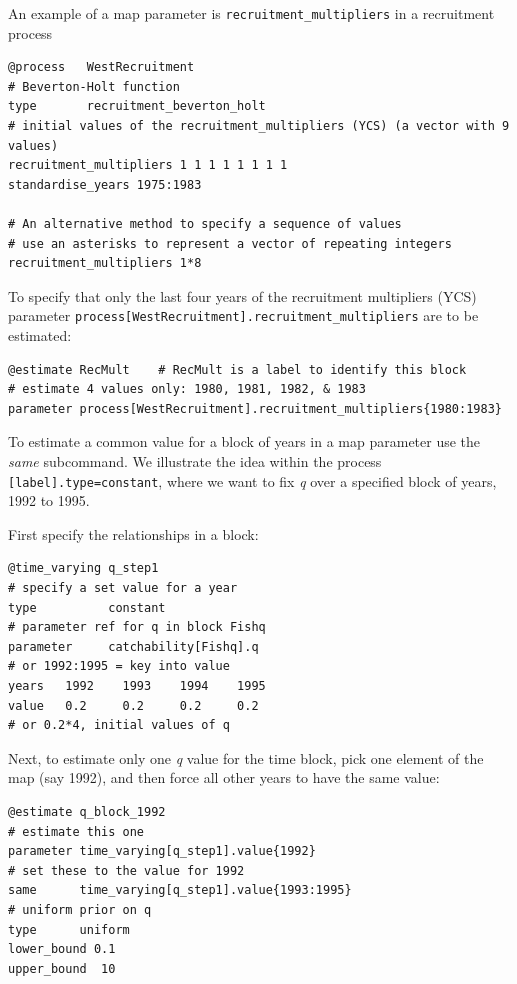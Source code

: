 An example of a map parameter is \texttt{recruitment\_multipliers} in a recruitment process

{\small{\begin{verbatim}
@process   WestRecruitment
# Beverton-Holt function
type       recruitment_beverton_holt
# initial values of the recruitment_multipliers (YCS) (a vector with 9 values)
recruitment_multipliers 1 1 1 1 1 1 1 1
standardise_years 1975:1983

# An alternative method to specify a sequence of values
# use an asterisks to represent a vector of repeating integers
recruitment_multipliers 1*8
\end{verbatim}}}

To specify that only the last four years of the recruitment multipliers (YCS) parameter \texttt{process[WestRecruitment].recruitment\_multipliers} are to be estimated:

{\small{\begin{verbatim}
@estimate RecMult    # RecMult is a label to identify this block
# estimate 4 values only: 1980, 1981, 1982, & 1983
parameter process[WestRecruitment].recruitment_multipliers{1980:1983}
\end{verbatim}}}

To estimate a common value for a block of years in a map parameter use the \textit{same} subcommand. We illustrate the idea within the process \texttt{[label].type=constant}, where we want to fix \textit{q} over a specified block of years, 1992 to 1995.

First specify the relationships in a  block:

{\small{\begin{verbatim}
@time_varying q_step1
# specify a set value for a year
type          constant
# parameter ref for q in block Fishq
parameter     catchability[Fishq].q
# or 1992:1995 = key into value
years 	1992	1993	1994	1995
value 	0.2		0.2		0.2		0.2
# or 0.2*4, initial values of q
\end{verbatim}}}

Next, to estimate only one \textit{q} value for the time block, pick one element of the map (say 1992), and then force all other years to have the same value:

{\small{\begin{verbatim}
@estimate q_block_1992
# estimate this one
parameter time_varying[q_step1].value{1992}
# set these to the value for 1992
same      time_varying[q_step1].value{1993:1995}
# uniform prior on q
type      uniform
lower_bound 0.1
upper_bound  10
\end{verbatim}}}

